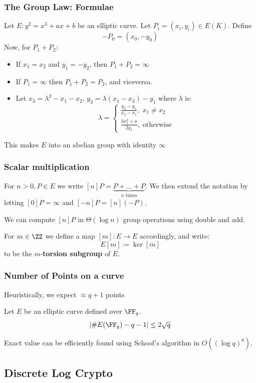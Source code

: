 \documentclass{beamer}
\begin{document}
\begin{frame}
    \frametitle{The Group Law: Formulae}
    Let $E: y^2 = x^3 + a x + b$ be an elliptic curve. Let $P_i = (x_i, y_i) \in E(K)$. Define 
    \[ -P_0 = (x_0, -y_0 )\]
    Now, for $P_1 + P_2$: 
    \begin{itemize}
        \item If $x_1 = x_2$ and $y_1 = -y_2$, then $P_1 + P_2 = \infty$
        \item If $P_1 = \infty$ then $P_1 + P_2 = P_2$, and viceversa.
        \item Let $x_3 = \lambda^2 - x_1 - x_2$, $y_3 = \lambda(x_1 - x_3) - y_1$ where $\lambda$ is:
        \[ \lambda = \begin{cases}
            \frac{y_2 - y_1}{x_2 - x_1}, \; x_1 \neq x_2 \\
            \frac{3 x_1^2 + a}{2y_1},\; \text{otherwise}
        \end{cases} \]
    \end{itemize}
    This makes $E$ into an abelian group with identity $\infty$ 
\end{frame}

\begin{frame}
    \frametitle{Scalar multiplication}
    For $n > 0, P \in E$ we write $[n]P = \underbrace{P + \dots + P}_{n \text{ times}}$. We then extend the notation by letting $[0]P = \infty$ and 
    $[-n]P = [n](-P)$.

    We can compute $[n]P$ in $\Theta(\log n)$ group operations using double and add.

    For $m \in \ZZ$ we define a map $[m]: E \to E$ accordingly, and write:
    \[ E[m] \coloneqq \ker[m] \]
    to be the $m$-\textbf{torsion subgroup} of $E$.
\end{frame}

\begin{frame}
    \frametitle{Number of Points on a curve}
    Heuristically, we expect $\approx q + 1$ points
    \begin{theorem}[Hasse]
        Let $E$ be an elliptic curve defined over $\FF_q$.
        \[ \left|\#E(\FF_q) - q - 1\right| \leq 2 \sqrt{q} \] 
    \end{theorem}
    Exact value can be efficiently found using Schoof's algorithm in $O((\log q)^8)$.
\end{frame}

\subsection{Discrete Log Crypto}
\end{document}
